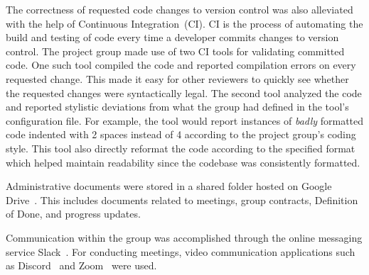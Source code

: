 The correctness of requested code changes to version control was also alleviated with the help of Continuous Integration~(CI).
CI is the process of automating the build and testing of code every time a developer commits changes to version control.
The project group made use of two CI tools for validating committed code.
One such tool compiled the code and reported compilation errors on every requested change.
This made it easy for other reviewers to quickly see whether the requested changes were syntactically legal.
The second tool analyzed the code and reported stylistic deviations from what the group had defined in the tool's configuration file.
For example, the tool would report instances of \textit{badly} formatted code indented with 2 spaces instead of 4 according to the project group's coding style.
This tool also directly reformat the code according to the specified format which helped maintain readability since the codebase was consistently formatted.

Administrative documents were stored in a shared folder hosted on Google Drive~\cite{google_drive}.
This includes documents related to meetings, group contracts, Definition of Done, and progress updates.

Communication within the group was accomplished through the online messaging service Slack~\cite{slack}.
For conducting meetings, video communication applications such as Discord~\cite{discord} and Zoom~\cite{zoom} were used.

